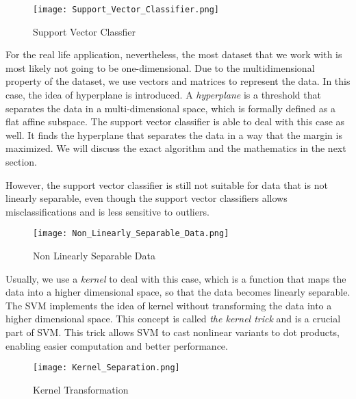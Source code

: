 \begin{figure}[h]%
    \begin{center}%
        \texttt{[image: Support\_Vector\_Classifier.png]}%
        \caption{Support Vector Classfier}\label{fig:}%
    \end{center}%
\end{figure}

For the real life application, nevertheless, the most dataset that we work with is 
most likely not going to be one-dimensional. Due to the multidimensional property of the dataset,
we use vectors and matrices 
to represent the data. In this case,
the idea of hyperplane is introduced. A \emph{hyperplane} is a threshold that separates the data in a multi-dimensional space,
which is formally defined as a flat affine subspace.\cite{R9} The support vector classifier is able to deal with this case as well.
It finds the hyperplane that separates the data in a way that the margin is maximized. We will discuss the exact algorithm and the
mathematics in the next section.

However, the support vector classifier is still not suitable for data that is not linearly separable, even though 
the support vector classifiers allows misclassifications and is less sensitive to outliers.
\begin{figure}[h]%
    \begin{center}%
        \texttt{[image: Non\_Linearly\_Separable\_Data.png]}%
        \caption{Non Linearly Separable Data}\label{fig:}%
    \end{center}%
\end{figure}

Usually, we use a \emph{kernel} to deal 
with this case, which is a function that maps the data into a higher dimensional space, so that the data becomes linearly
separable. The SVM implements the idea of kernel without transforming the data into a higher dimensional space. This concept is 
called \emph{the kernel trick} and is a crucial part of SVM. This trick allows SVM to cast nonlinear variants to dot products,
enabling easier computation and better performance. \cite{Kernel2}
\begin{figure}[h]%
    \begin{center}%
        \texttt{[image: Kernel\_Separation.png]}%
        \caption{Kernel Transformation}\label{fig:}%
    \end{center}%
\end{figure}
